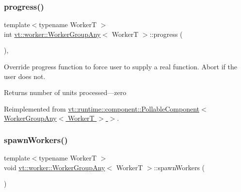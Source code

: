 \mbox{\label{structvt_1_1worker_1_1_worker_group_any_a1a2d6dc321514501e00c0373f2583146}} 
\subsubsection{\texorpdfstring{progress()}{progress()}}
{\footnotesize\ttfamily template$<$typename WorkerT $>$ \\
int \hyperlink{structvt_1_1worker_1_1_worker_group_any}{vt\+::worker\+::\+Worker\+Group\+Any}$<$ WorkerT $>$\+::progress (\begin{DoxyParamCaption}{ }\end{DoxyParamCaption})\hspace{0.3cm}{\ttfamily [override]}, {\ttfamily [virtual]}}



Override progress function to force user to supply a real function. Abort if the user does not. 

\begin{DoxyReturn}{Returns}
number of units processed---zero 
\end{DoxyReturn}


Reimplemented from \hyperlink{structvt_1_1runtime_1_1component_1_1_pollable_component_a34cad810026224d550cd9b0c9d1eff22}{vt\+::runtime\+::component\+::\+Pollable\+Component$<$ Worker\+Group\+Any$<$ Worker\+T $>$ $>$}.

\mbox{\label{structvt_1_1worker_1_1_worker_group_any_a42edae3e278faf46177ef36719b79e02}} 
\subsubsection{\texorpdfstring{spawn\+Workers()}{spawnWorkers()}}
{\footnotesize\ttfamily template$<$typename WorkerT $>$ \\
void \hyperlink{structvt_1_1worker_1_1_worker_group_any}{vt\+::worker\+::\+Worker\+Group\+Any}$<$ WorkerT $>$\+::spawn\+Workers (\begin{DoxyParamCaption}{ }\end{DoxyParamCaption})}

